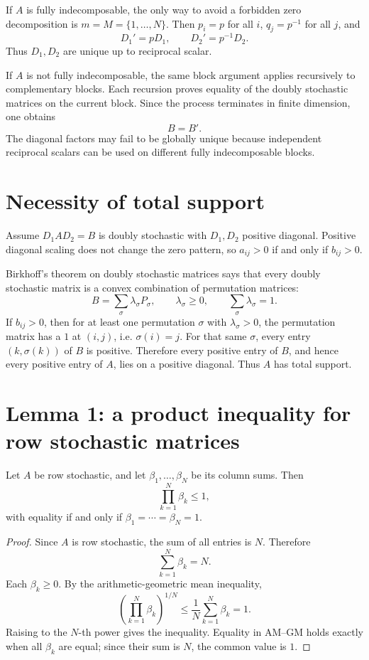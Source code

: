 If \(A\) is fully indecomposable, the only way to avoid a forbidden zero decomposition is \(m=M=\{1,
\ldots,N\}\).  Then \(p_i=p\) for all \(i\), \(q_j=p^{-1}\) for all \(j\), and
\[
  D_1'=pD_1,
  \qquad
  D_2'=p^{-1}D_2.
\]
Thus \(D_1,D_2\) are unique up to reciprocal scalar.

If \(A\) is not fully indecomposable, the same block argument applies recursively to complementary blocks.  Each recursion proves equality of the doubly stochastic matrices on the current block.  Since the process terminates in finite dimension, one obtains
\[
  B=B'.
\]
The diagonal factors may fail to be globally unique because independent reciprocal scalars can be used on different fully indecomposable blocks.

\section{Necessity of total support}
Assume \(D_1AD_2=B\) is doubly stochastic with \(D_1,D_2\) positive diagonal.  Positive diagonal scaling does not change the zero pattern, so \(a_{ij}>0\) if and only if \(b_{ij}>0\).

Birkhoff's theorem on doubly stochastic matrices says that every doubly stochastic matrix is a convex combination of permutation matrices:
\[
  B=\sum_\sigma \lambda_\sigma P_\sigma,
  \qquad
  \lambda_\sigma\ge0,
  \qquad
  \sum_\sigma\lambda_\sigma=1.
\]
If \(b_{ij}>0\), then for at least one permutation \(\sigma\) with \(\lambda_\sigma>0\), the permutation matrix has a \(1\) at \((i,j)\), i.e. \(\sigma(i)=j\).  For that same \(\sigma\), every entry \((k,\sigma(k))\) of \(B\) is positive.  Therefore every positive entry of \(B\), and hence every positive entry of \(A\), lies on a positive diagonal.  Thus \(A\) has total support.

\section{Lemma 1: a product inequality for row stochastic matrices}
\begin{lemma}
Let \(A\) be row stochastic, and let \(\beta_1,
\ldots,\beta_N\) be its column sums.  Then
\[
  \prod_{k=1}^N\beta_k\le1,
\]
with equality if and only if \(\beta_1=\cdots=\beta_N=1\).
\end{lemma}

\begin{proof}
Since \(A\) is row stochastic, the sum of all entries is \(N\).  Therefore
\[
  \sum_{k=1}^N\beta_k=N.
\]
Each \(\beta_k\ge0\).  By the arithmetic-geometric mean inequality,
\[
  \left(\prod_{k=1}^N\beta_k\right)^{1/N}
  \le \frac1N\sum_{k=1}^N\beta_k=1.
\]
Raising to the \(N\)-th power gives the inequality.  Equality in AM--GM holds exactly when all \(\beta_k\) are equal; since their sum is \(N\), the common value is \(1\).
\end{proof}

